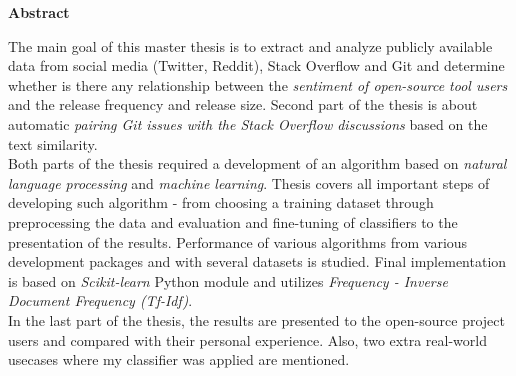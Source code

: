 \begin{center}
\textbf{Abstract}
\end{center}

The main goal of this master thesis is to extract and analyze publicly available data from social media (Twitter, Reddit), Stack Overflow and Git and determine whether is there any relationship between the \textit{sentiment of open-source tool users} and the release frequency and release size. Second part of the thesis is about automatic \textit{pairing Git issues with the Stack Overflow discussions} based on the text similarity.\\
Both parts of the thesis required a development of an algorithm based on \textit{natural language processing} and \textit{machine learning}. Thesis covers all important steps of developing such algorithm - from choosing a training dataset through preprocessing the data and evaluation and fine-tuning of classifiers to the presentation of the results. Performance of various algorithms from various development packages and with several datasets is studied. Final implementation is based on \textit{Scikit-learn} Python module and utilizes \textit{Frequency - Inverse Document Frequency (Tf-Idf)}.\\
In the last part of the thesis, the results are presented to the open-source project users and compared with their personal experience. Also, two extra real-world usecases where my classifier was applied are mentioned.